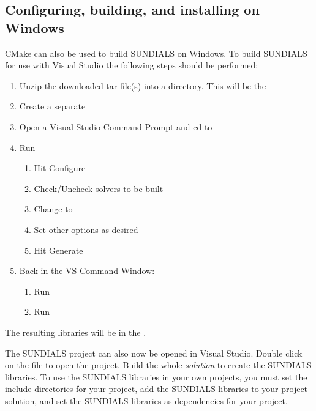 \documentclass[letterpaper,10pt,english]{sphinxmanual}
\begin{document}
\subsection{Configuring, building, and installing on Windows}
\label{Install:installation-cmake-windows}\label{Install:configuring-building-and-installing-on-windows}
CMake can also be used to build SUNDIALS on Windows. To build SUNDIALS
for use with Visual Studio the following steps should be performed:
\begin{enumerate}
\item {} 
Unzip the downloaded tar file(s) into a directory. This will be the

\item {} 
Create a separate 

\item {} 
Open a Visual Studio Command Prompt and cd to 

\item {} 
Run 
\begin{enumerate}
\item {} 
Hit Configure

\item {} 
Check/Uncheck solvers to be built

\item {} 
Change  to 

\item {} 
Set other options as desired

\item {} 
Hit Generate

\end{enumerate}

\item {} 
Back in the VS Command Window:
\begin{enumerate}
\item {} 
Run 

\item {} 
Run 

\end{enumerate}

\end{enumerate}

The resulting libraries will be in the .

The SUNDIALS project can also now be opened in Visual Studio.
Double click on the  file to open the project.
Build the whole \emph{solution} to create the SUNDIALS libraries.
To use the SUNDIALS libraries in your own projects, you must
set the include directories for your project,
add the SUNDIALS libraries to your project solution,
and set the SUNDIALS libraries as dependencies for your project.
\end{document}
